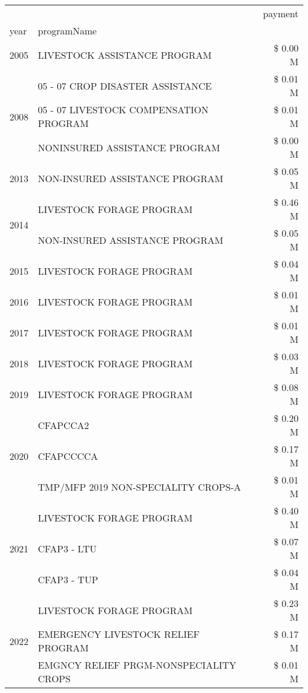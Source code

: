 \begin{tabular}{llr}
\toprule
 &  & payment \\
year & programName &  \\
\midrule
2005 & LIVESTOCK ASSISTANCE PROGRAM & \$ 0.00 M \\
\cline{1-3}
\multirow[t]{3}{*}{2008} & 05 - 07 CROP DISASTER ASSISTANCE & \$ 0.01 M \\
 & 05 - 07 LIVESTOCK COMPENSATION PROGRAM & \$ 0.01 M \\
 & NONINSURED ASSISTANCE PROGRAM & \$ 0.00 M \\
\cline{1-3}
2013 & NON-INSURED ASSISTANCE PROGRAM & \$ 0.05 M \\
\cline{1-3}
\multirow[t]{2}{*}{2014} & LIVESTOCK FORAGE PROGRAM & \$ 0.46 M \\
 & NON-INSURED ASSISTANCE PROGRAM & \$ 0.05 M \\
\cline{1-3}
2015 & LIVESTOCK FORAGE PROGRAM & \$ 0.04 M \\
\cline{1-3}
2016 & LIVESTOCK FORAGE PROGRAM & \$ 0.01 M \\
\cline{1-3}
2017 & LIVESTOCK FORAGE PROGRAM & \$ 0.01 M \\
\cline{1-3}
2018 & LIVESTOCK FORAGE PROGRAM & \$ 0.03 M \\
\cline{1-3}
2019 & LIVESTOCK FORAGE PROGRAM & \$ 0.08 M \\
\cline{1-3}
\multirow[t]{3}{*}{2020} & CFAPCCA2 & \$ 0.20 M \\
 & CFAPCCCCA & \$ 0.17 M \\
 & TMP/MFP 2019 NON-SPECIALITY CROPS-A & \$ 0.01 M \\
\cline{1-3}
\multirow[t]{3}{*}{2021} & LIVESTOCK FORAGE PROGRAM & \$ 0.40 M \\
 & CFAP3 - LTU & \$ 0.07 M \\
 & CFAP3 - TUP & \$ 0.04 M \\
\cline{1-3}
\multirow[t]{3}{*}{2022} & LIVESTOCK FORAGE PROGRAM & \$ 0.23 M \\
 & EMERGENCY LIVESTOCK RELIEF PROGRAM & \$ 0.17 M \\
 & EMGNCY RELIEF PRGM-NONSPECIALITY CROPS & \$ 0.01 M \\
\cline{1-3}
\bottomrule
\end{tabular}
